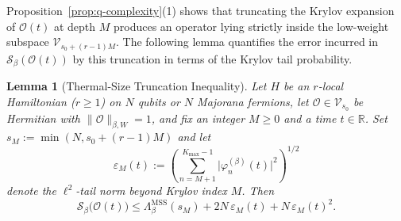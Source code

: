 \documentclass[11pt,a4paper]{article}
\numberwithin{equation}{section}
\theoremstyle{plain}
\newtheorem{lemma}[theorem]{Lemma}
\theoremstyle{definition}
\newcommand{\MSS}{\mathrm{MSS}}
\begin{document}
Proposition~\ref{prop:q-complexity}(1) shows that truncating the Krylov expansion of $\mathcal{O}(t)$ at depth $M$ produces an operator lying strictly inside the low-weight subspace $\mathcal{V}_{s_0+(r-1)M}$. The following lemma quantifies the error incurred in $\mathcal{S}_\beta(\mathcal{O}(t))$ by this truncation in terms of the Krylov tail probability.

\begin{lemma}[Thermal-Size Truncation Inequality]\label{lem:truncation}
Let $H$ be an $r$-local Hamiltonian ($r\ge 1$) on $N$ qubits or $N$ Majorana fermions, let $\mathcal{O}\in\mathcal{V}_{s_0}$ be Hermitian with $\|\mathcal{O}\|_{\beta,W}=1$, and fix an integer $M\ge 0$ and a time $t\in\mathbb{R}$. Set $s_M := \min(N, s_0+(r-1)M)$ and let
\[
  \varepsilon_M(t) := \left(\sum_{n=M+1}^{K_{\max}-1}\bigl|\varphi_n^{(\beta)}(t)\bigr|^2\right)^{1/2}
\]
denote the $\ell^2$-tail norm beyond Krylov index $M$. Then
\begin{equation}\label{eq:truncation}
  \mathcal{S}_\beta\bigl(\mathcal{O}(t)\bigr) \le \Lambda_\beta^{\MSS}(s_M) + 2N\,\varepsilon_M(t) + N\,\varepsilon_M(t)^2.
\end{equation}
\end{lemma}
\end{document}
